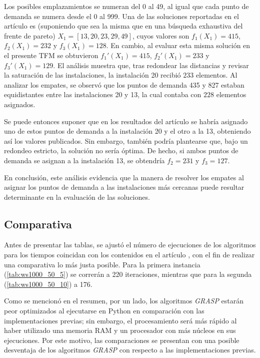 \documentclass[12pt,a4paper]{book}
\begin{document}
Los posibles emplazamientos se numeran del 0 al 49, al igual que cada punto de demanda se numera desde el 0 al 999. Una de las soluciones reportadas en el artículo es (suponiendo que sea la misma que en una búsqueda exhaustiva del frente de pareto) $X_1 = [13, 20, 23, 29, 49]$, cuyos valores son $f_1(X_1) = 415$, $f_2(X_1) = 232$ y $f_3(X_1) = 128$. En cambio, al evaluar esta misma solución en el presente TFM se obtuvieron $f_1'(X_1) = 415$, $f_2'(X_1) = 233$ y $f_3'(X_1) = 129$.
El análisis muestra que, tras redondear las distancias y revisar la saturación de las instalaciones, la instalación 20 recibió $233$ elementos. Al analizar los empates, se observó que los puntos de demanda 435 y 827 estaban equidistantes entre las instalaciones 20 y 13, la cual contaba con $228$ elementos asignados.

Se puede entonces suponer que en los resultados del artículo se habría asignado uno de estos puntos de demanda a la instalación 20 y el otro a la 13, obteniendo así los valores publicados. Sin embargo, también podría plantearse que, bajo un redondeo estricto, la solución no sería óptima.
De hecho, si ambos puntos de demanda se asignan a la instalación 13, se obtendría $f_2 = 231$ y $f_3 = 127$.

En conclusión, este análisis evidencia que la manera de resolver los empates al asignar los puntos de demanda a las instalaciones más cercanas puede resultar determinante en la evaluación de las soluciones.

\subsection{Comparativa}

Antes de presentar las tablas, se ajustó el número de ejecuciones de los algoritmos para los tiempos coincidan con los contenidos en el artículo \cite{k-balanced_1}, con el fin de realizar una comparativa lo más justa posible. Para la primera instancia (\ref{tab:ws1000_50_5}) se correrán a 220 iteraciones, mientras que para la segunda (\ref{tab:ws1000_50_10}) a 176.

Como se mencionó en el resumen, por un lado, los algoritmos \textit{GRASP} estarán peor optimizados al ejecutarse en 
Python en comparación con las implementaciones previas; sin embargo, el procesamiento será más rápido al haber utilizado una memoria RAM y un procesador con más núcleos en sus ejecuciones. Por este motivo, las comparaciones se presentan con una posible desventaja de los algoritmos \textit{GRASP} con respecto a las implementaciones previas.
\end{document}
